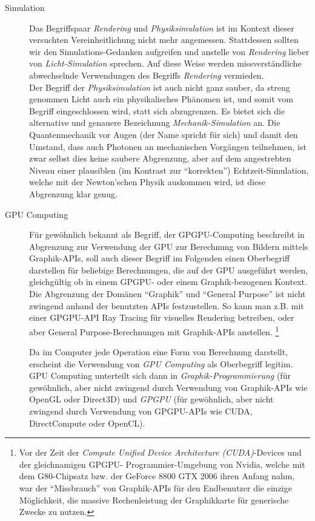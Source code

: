 \begin{description}
	\item[Simulation] Das Begriffspaar \emph{Rendering} und \emph{Physiksimulation} ist im Kontext dieser versuchten 
	Vereinheitlichung nicht mehr angemessen. Stattdessen sollten wir den Simulations-Gedanken aufgreifen und anstelle von
	\emph{Rendering} lieber von \emph{Licht-Simulation} sprechen. Auf diese Weise werden missverständliche abwechselnde 
	Verwendungen des Begriffs \emph{Rendering} vermieden.\\
	Der Begriff der \emph{Physiksimulation} ist auch nicht ganz sauber, da streng genommen Licht auch ein physikalisches
	Phänomen ist, und somit vom Begriff eingeschlossen wird, statt sich abzugrenzen. Es bietet sich die alternative und 
	genauere  Bezeichnung \emph{Mechanik-Simulation} an. Die Quantenmechanik vor Augen (der Name spricht für sich) und 
	damit den Umstand, dass auch Photonen an mechanischen Vorgängen teilnehmen, ist zwar selbst dies keine saubere 	
	Abgrenzung, aber auf dem angestrebten Niveau einer plausiblen (im Kontrast zur "`korrekten"') Echtzeit-Simulation, 
	welche mit der Newton'schen Physik auskommen wird, ist diese Abgrenzung klar genug.
	
	\item[GPU Computing]
	Für gewöhnlich bekannt als Begriff, der GPGPU-Computing beschreibt in Abgrenzung zur Verwendung der GPU zur Berechnung 
	von	Bildern mittels Graphik-APIs, soll auch dieser Begriff im Folgenden einen Oberbegriff darstellen für beliebige
	Berechnungen, die auf der GPU ausgeführt werden, gleichgültig ob in einem GPGPU- oder einem Graphik-bezogenen Kontext.
	Die Abgrenzung der Domänen "`Graphik"' und "`General Purpose"' ist nicht zwingend anhand der benutzten APIs 
	festzustellen. So kann man z.B. mit einer GPGPU-API Ray Tracing für visuelles Rendering betreiben, oder aber 
	General Purpose-Berechnungen mit Graphik-APIs anstellen.
	\footnote{Vor der Zeit der \emph{Compute Unified Device Architecture (CUDA)}-Devices und der gleichnamigen GPGPU-
	Programmier-Umgebung von Nvidia, welche mit dem G80-Chipsatz bzw. der GeForce 8800 GTX 2006 ihren Anfang nahm, war
	der "`Missbrauch"' von Graphik-APIs für den Endbenutzer die einzige Möglichkeit, die massive Rechenleistung der
	Graphikkarte für generische Zwecke zu nutzen.}
	
	Da im Computer jede Operation eine Form von Berechnung darstellt, erscheint die Verwendung von \emph{GPU Computing}
	als Oberbegriff legitim. GPU Computing unterteilt sich dann in \emph{Graphik-Programmierung} (für gewöhnlich, aber 
	nicht zwingend durch Verwendung von Graphik-APIs wie OpenGL oder Direct3D) und \emph{GPGPU} (für gewöhnlich, aber 
	nicht zwingend durch Verwendung von GPGPU-APIs wie CUDA, DirectCompute oder OpenCL).
		

	
\end{description}

